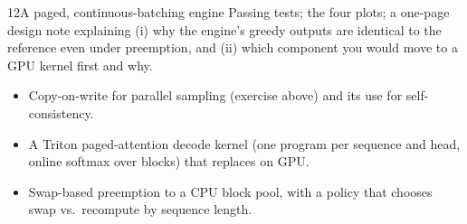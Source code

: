 \begin{labbox}{12}{A paged, continuous-batching engine}
Passing tests; the four plots; a one-page design note explaining (i) why the engine's greedy outputs
are identical to the reference even under preemption, and (ii) which component you would move to a GPU
kernel first and why.

\begin{itemize}
  \item Copy-on-write  for parallel sampling (exercise above) and its use for self-consistency.
  \item A Triton paged-attention decode kernel (one program per sequence and head, online softmax over
    blocks) that replaces  on GPU.
  \item Swap-based preemption to a CPU block pool, with a policy that chooses swap vs.\ recompute by
    sequence length.
\end{itemize}
\end{labbox}
